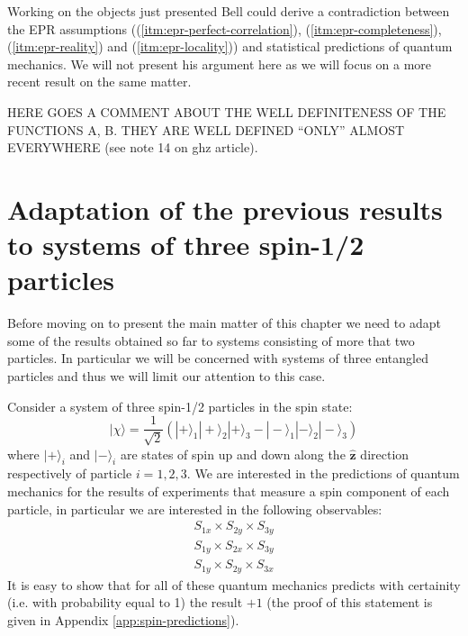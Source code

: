 \begin{observation}
Working on the objects just presented Bell \cite{Bell1964} could derive a contradiction between the EPR assumptions ((\ref{itm:epr-perfect-correlation}), (\ref{itm:epr-completeness}), (\ref{itm:epr-reality}) and (\ref{itm:epr-locality})) and statistical predictions of quantum mechanics. We will not present his argument here as we will focus on a more recent result on the same matter.
\end{observation}

\begin{observation}
  HERE GOES A COMMENT ABOUT THE WELL DEFINITENESS OF THE FUNCTIONS A, B. THEY ARE WELL DEFINED ``ONLY'' ALMOST EVERYWHERE (see note 14 on ghz article).
\end{observation}


\section{Adaptation of the previous results to systems of three spin-1/2 particles}
Before moving on to present the main matter of this chapter we need to adapt some of the results obtained so far to systems consisting of more that two particles. In particular we will be concerned with systems of three entangled particles and thus we will limit our attention to this case.%

Consider a system of three spin-1/2 particles in the spin state:
\begin{equation}
  |\chi\rangle = \frac{1}{\sqrt{2}} \left( |+\rangle_1 |+\rangle_2 |+\rangle_3 - |-\rangle_1 |-\rangle_2 |-\rangle_3 \right)
  \label{eq:ghz-state}
\end{equation}
where $|+\rangle_i$ and $|-\rangle_i$ are states of spin up and down along the $\mathbf{\hat{z}}$ direction respectively of particle $i = 1, 2, 3$.
We are interested in the predictions of quantum mechanics for the results of experiments that measure a spin component of each particle, in particular we are interested in the following observables:
\begin{equation}
  \begin{split}
    S_{1x} \times S_{2y} \times S_{3y}\\
    S_{1y} \times S_{2x} \times S_{3y}\\
    S_{1y} \times S_{2y} \times S_{3x}
  \end{split}
  \label{eq:xyy-observables}
\end{equation}
It is easy to show that for all of these quantum mechanics predicts with certainity (i.e. with probability equal to 1) the result $+ 1$ (the proof of this statement is given in Appendix \ref{app:spin-predictions}).

